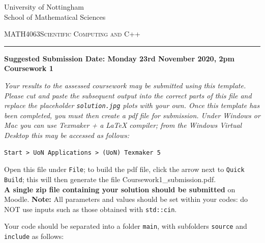 \documentclass[a4,10pt, fleqn]{article}  %
\begin{document}
\sffamily%
\thispagestyle{empty}
\begin{center}
University of Nottingham\\
School of Mathematical Sciences
\end{center}
\large\textsc {MATH4063}\hfill\large\textsc {Scientific Computing and C++}%

\vspace*{2ex}
\hrule
\vskip0.25cm
\textbf{Suggested Submission Date: Monday 23rd November 2020, 2pm}
\hfill \textbf{Coursework 1}\\

\noindent
{\em Your results to the assessed coursework may be submitted using
this template. Please cut and paste the subsequent output into the correct parts
of this file and replace the placeholder \verb|solution.jpg| plots with your own. Once this
template has been completed, you must then create a pdf file for submission. Under Windows or Mac you can use Texmaker + a LaTeX compiler; from the Windows Virtual Desktop this may be accessed as follows:
\begin{verbatim}
Start > UoN Applications > (UoN) Texmaker 5
\end{verbatim}
 Open this file under {\tt File}; to build the pdf file, click the arrow next to {\tt Quick Build}; this will then generate the file Coursework1\_submission.pdf.\\

{\bf A single zip file containing your solution should be submitted} on Moodle. {\bf Note:}  All parameters and values should be set within your codes: do NOT use inputs such as those obtained with {\tt std::cin}.
}

Your code should be separated into a folder \verb|main|, with subfolders \verb|source| and \verb|include| as follows:
\end{document}
